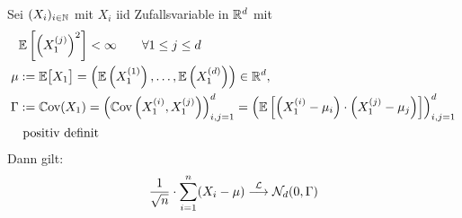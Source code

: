\begin{korollar}\label{korollar6.3}
Sei $(X_i)_{i\in\mathbb{N}}$ mit $X_i$ iid Zufallsvariable in $\mathbb{R}^d$ mit
\begin{align*}
&\mathbb{E}\left[\left(X_1^{(j)}\right)^2\right]<\infty\qquad\forall 1\leq j\leq d\\
\mu&:=\mathbb{E}\big[X_1\big]=\left(\mathbb{E}\left(X_1^{(1)}\right),\ldots,\mathbb{E}\left(X_1^{(d)}\right)\right)\in\mathbb{R}^d,\\
\Gamma&:=\mathbb{C}\text{ov}(X_1)
=\left(\mathbb{C}\text{ov}\left(X_1^{(i)},X_1^{(j)}\right)\right)_{i,j=1}^d
=\left(\mathbb{E}\left[\left(X_1^{(i)}-\mu_i\right)\cdot\left(X_1^{(j)}-\mu_j\right)\right]\right)_{i,j=1}^d\\&\text{ positiv definit}
\end{align*}
Dann gilt:
\begin{align*}
\frac{1}{\sqrt{n}}\cdot\sum\limits_{i=1}^n(X_i-\mu)\stackrel{\mathcal{L}}{\longrightarrow}\mathcal{N}_d(0,\Gamma)
\end{align*}
\end{korollar}
